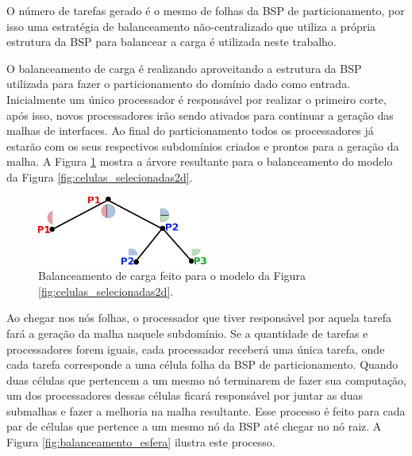 O número de tarefas gerado é o mesmo de folhas da BSP de particionamento, por isso uma estratégia de balanceamento não-centralizado que utiliza a própria estrutura da BSP para balancear a carga é utilizada neste trabalho.

O balanceamento de carga é realizando aproveitando a estrutura da BSP utilizada para fazer o particionamento do domínio dado como entrada. Inicialmente um único processador é responsável por realizar o primeiro corte, após isso, novos processadores irão sendo ativados para continuar a geração das malhas de interfaces. Ao final do particionamento todos os processadores já estarão com os seus respectivos subdomínios criados e prontos para a geração da malha. A Figura \ref{fig:arvore_balanceamento} mostra a árvore resultante para o balanceamento do modelo da Figura \ref{fig:celulas_selecionadas2d}.


\begin{figure}[!ht]
	\centering
	\includegraphics[width=0.5\textwidth]{fig/arvore_balanceamento.png}
	\caption{Balanceamento de carga feito para o modelo da Figura \ref{fig:celulas_selecionadas2d}.}
	\label{fig:arvore_balanceamento}
\end{figure}


Ao chegar nos nós folhas, o processador que tiver responsável por aquela tarefa fará a geração da malha naquele subdomínio. Se a quantidade de tarefas e processadores forem iguais, cada processador receberá uma única tarefa, onde cada tarefa corresponde a uma célula folha da BSP de particionamento. Quando duas células que pertencem a um mesmo nó terminarem de fazer sua computação, um dos processadores dessas células ficará responsável por juntar as duas submalhas e fazer a melhoria na malha resultante. Esse processo é feito para cada par de células que pertence a um mesmo nó da BSP até chegar no nó raiz. A Figura \ref{fig:balanceamento_esfera} ilustra este processo.


